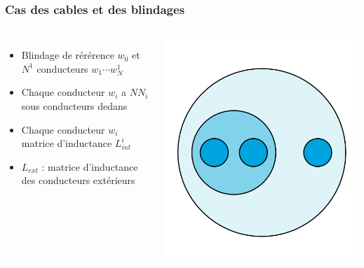 \begin{frame}
\frametitle{Cas des cables et des blindages}
  \begin{columns}[T]
    \begin{itemize}
      \item Blindage de r\'er\'erence $w_0$ et $N^1$ conducteurs $w_1 \cdots w^1_N$
      \item Chaque conducteur $w_i$ a $NN_i$ sous conducteurs dedans
      \item Chaque conducteur $w_i$ matrice d'inductance $L_{int}^i$
      \item $L_{ext}$ : matrice d'inductance des conducteurs ext\'erieurs  
    \end{itemize}
\begin{center}
\includegraphics[scale=0.25]{figures/f2}
\end{center}
  \end{columns}
\end{frame}

